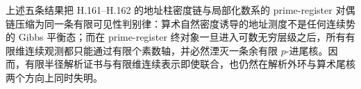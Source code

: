 \noindent
上述五条结果把 H.161--H.162 的地址柱密度链与局部化数系的 prime-register 对偶链压缩为同一条有限可见性判别律：算术自然密度诱导的地址测度不是任何连续势的 Gibbs 平衡态；而在 prime-register 终对象一旦进入可数无穷层级之后，所有有限维连续观测都只能通过有限个素数轴，并必然湮灭一条余有限 \(p\)-进尾核。因而，有限半径解析证书与有限维连续表示即使联合，也仍然在解析外环与算术尾核两个方向上同时失明。
